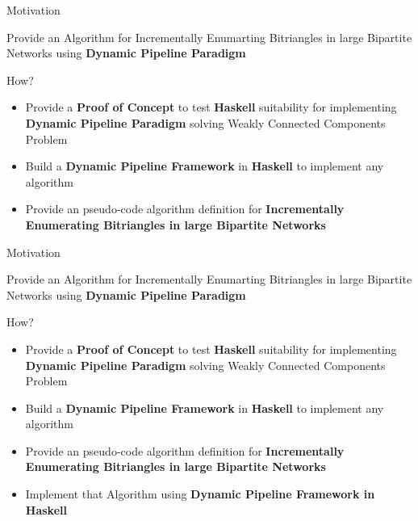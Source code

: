 \documentclass{beamer}
\begin{document}
  \begin{frame}[fragile]{Motivation}
    \begin{center}
      Provide an Algorithm for Incrementally Enumarting Bitriangles in large Bipartite Networks using \textbf{Dynamic Pipeline Paradigm}
    \end{center}    
    \begin{block}{How?}
      \begin{itemize}
        \item {\color{light}Provide a \textbf{Proof of Concept} to test \textbf{Haskell} suitability for implementing  \textbf{Dynamic Pipeline Paradigm} solving Weakly Connected Components Problem}
        \item {\color{light}Build a \textbf{Dynamic Pipeline Framework} in \textbf{Haskell} to implement any algorithm }
        \item Provide an pseudo-code algorithm definition for \textbf{Incrementally Enumerating Bitriangles in large Bipartite Networks}
    \end{itemize}   
  \end{block} 
  \end{frame}

  \begin{frame}[fragile]{Motivation}
    \begin{center}
      Provide an Algorithm for Incrementally Enumarting Bitriangles in large Bipartite Networks using \textbf{Dynamic Pipeline Paradigm}
    \end{center}    
    \begin{block}{How?}
      \begin{itemize}
        \item {\color{light}Provide a \textbf{Proof of Concept} to test \textbf{Haskell} suitability for implementing  \textbf{Dynamic Pipeline Paradigm} solving Weakly Connected Components Problem}
        \item {\color{light}Build a \textbf{Dynamic Pipeline Framework} in \textbf{Haskell} to implement any algorithm }
        \item {\color{light}Provide an pseudo-code algorithm definition for \textbf{Incrementally Enumerating Bitriangles in large Bipartite Networks}}
        \item Implement that Algorithm using \textbf{Dynamic Pipeline Framework in Haskell}
    \end{itemize}   
  \end{block} 
  \end{frame}
\end{document}

